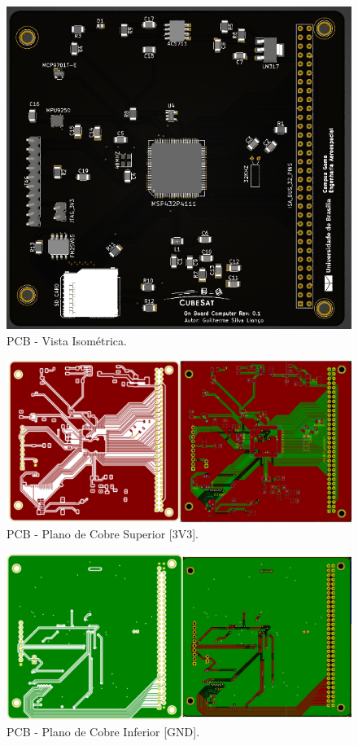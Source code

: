 \begin{apendicesenv}
\begin{figure}[!h]
	\centerfloat
	\centering
	\includegraphics[keepaspectratio=true,scale=0.65]{figuras/pcbRealistic_2.PNG}
	\caption{PCB - Vista Isométrica.}
	\label{pcbRealistic_2}
\end{figure}

\begin{figure}[!h]
	\centerfloat
	\centering
	\includegraphics[keepaspectratio=true,scale=0.5]{figuras/upperLayer_.PNG}
	\caption{PCB - Plano de Cobre Superior [3V3].}
	\label{signalLayout}
\end{figure}

\begin{figure}[!h]
	\centerfloat
	\centering
	\includegraphics[keepaspectratio=true,scale=0.5]{figuras/bottomLayer_.PNG}
	\caption{PCB - Plano de Cobre Inferior [GND].}
	\label{gndSignal}
\end{figure}



\end{apendicesenv}
